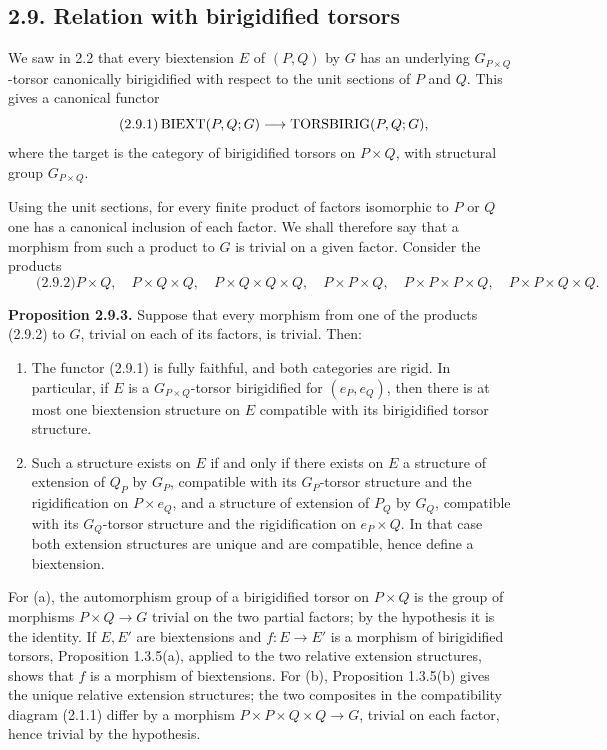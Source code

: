 \documentclass[11pt]{article}
\begin{document}
\subsection*{2.9. Relation with birigidified torsors}
We saw in 2.2 that every biextension \(E\) of \((P,Q)\) by \(G\) has an underlying \(G_{P\times Q}\)-torsor canonically birigidified with respect to the unit sections of \(P\) and \(Q\).  This gives a canonical functor
\begin{equation}\qquad\text{(2.9.1)}
  \operatorname{BIEXT}(P,Q;G)\longrightarrow\operatorname{TORSBIRIG}(P,Q;G),
\end{equation}
where the target is the category of birigidified torsors on \(P\times Q\), with structural group \(G_{P\times Q}\).

Using the unit sections, for every finite product of factors isomorphic to \(P\) or \(Q\) one has a canonical inclusion of each factor.  We shall therefore say that a morphism from such a product to \(G\) is trivial on a given factor.  Consider the products
\begin{equation}\qquad\text{(2.9.2)}
  P\times Q,
  \quad P\times Q\times Q,
  \quad P\times Q\times Q\times Q,
  \quad P\times P\times Q,
  \quad P\times P\times P\times Q,
  \quad P\times P\times Q\times Q.
\end{equation}

\textbf{Proposition 2.9.3.}  Suppose that every morphism from one of the products (2.9.2) to \(G\), trivial on each of its factors, is trivial.  Then:
\begin{enumerate}[label=\alph*)]
\item The functor (2.9.1) is fully faithful, and both categories are rigid.  In particular, if \(E\) is a \(G_{P\times Q}\)-torsor birigidified for \((e_P,e_Q)\), then there is at most one biextension structure on \(E\) compatible with its birigidified torsor structure.
\item Such a structure exists on \(E\) if and only if there exists on \(E\) a structure of extension of \(Q_P\) by \(G_P\), compatible with its \(G_P\)-torsor structure and the rigidification on \(P\times e_Q\), and a structure of extension of \(P_Q\) by \(G_Q\), compatible with its \(G_Q\)-torsor structure and the rigidification on \(e_P\times Q\).  In that case both extension structures are unique and are compatible, hence define a biextension.
\end{enumerate}

For (a), the automorphism group of a birigidified torsor on \(P\times Q\) is the group of morphisms \(P\times Q\to G\) trivial on the two partial factors; by the hypothesis it is the identity.  If \(E,E'\) are biextensions and \(f:E\to E'\) is a morphism of birigidified torsors, Proposition 1.3.5(a), applied to the two relative extension structures, shows that \(f\) is a morphism of biextensions.  For (b), Proposition 1.3.5(b) gives the unique relative extension structures; the two composites in the compatibility diagram (2.1.1) differ by a morphism \(P\times P\times Q\times Q\to G\), trivial on each factor, hence trivial by the hypothesis.
\end{document}
